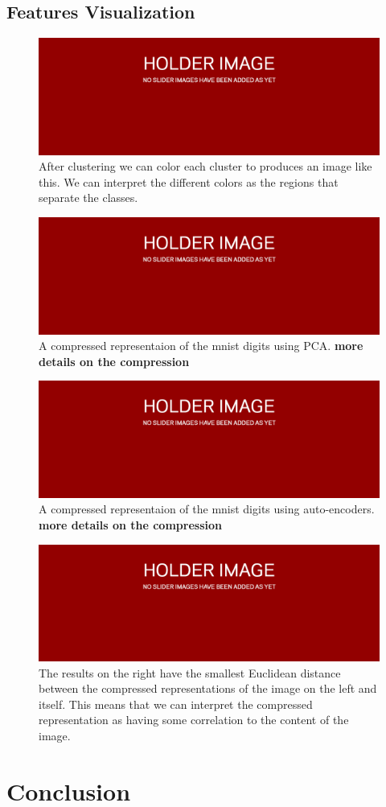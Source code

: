 \documentclass[11pt]{article}
\newcommand{\mcolor}[2][red]{{\color{#1}\textbf{#2}}}
\begin{document}
\subsection{Features Visualization}

\begin{minipage}{0.47\linewidth}
  \begin{figure}[H]
    \centering
    \includegraphics[width=0.4\linewidth]{holder}
    \caption{After clustering we can color each cluster to produces an image like this. We can interpret the different colors as the regions that separate the classes.}
    \label{fig:kmeans_image}
  \end{figure}
\end{minipage}\hfill
\begin{minipage}{0.47\linewidth}
  \begin{figure}[H]
    \centering
    \includegraphics[width=0.4\linewidth]{holder}
    \caption{A compressed representaion of the mnist digits using PCA.  \mcolor{more details on the compression}}
    \label{fig:pca_image}
  \end{figure}
\end{minipage}

\begin{minipage}{0.47\linewidth}
  \begin{figure}[H]
    \centering
    \includegraphics[width=0.4\linewidth]{holder}
    \caption{A compressed representaion of the mnist digits using auto-encoders. \mcolor{more details on the compression}}
    \label{fig:autoenc_image}
  \end{figure}
\end{minipage}\hfill
\begin{minipage}{0.47\linewidth}
  \begin{figure}[H]
    \centering
    \includegraphics[width=0.4\linewidth]{holder}
    \caption{The results on the right have the smallest Euclidean distance between the compressed representations of the image on the left and itself. This means that we can interpret the compressed representation as having some correlation to the content of the image.}
    \label{fig:autoenc_fetch}
  \end{figure}
\end{minipage}



\section{Conclusion}



\printbibliography
\end{document}
